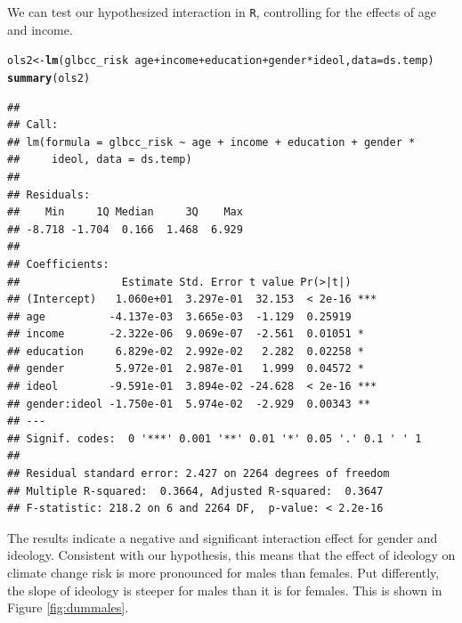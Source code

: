 \documentclass[11pt,openany]{book}
\makeatletter
\newcommand{\hlopt}[1]{\textcolor[rgb]{0,0,0}{#1}}%
\newcommand{\hlstd}[1]{\textcolor[rgb]{0.345,0.345,0.345}{#1}}%
\newcommand{\hlkwb}[1]{\textcolor[rgb]{0.69,0.353,0.396}{#1}}%
\newcommand{\hlkwc}[1]{\textcolor[rgb]{0.333,0.667,0.333}{#1}}%
\newcommand{\hlkwd}[1]{\textcolor[rgb]{0.737,0.353,0.396}{\textbf{#1}}}%
\newenvironment{kframe}{%
 \def\at@end@of@kframe{}%
 \ifinner\ifhmode%
  \def\at@end@of@kframe{\end{minipage}}%
  \begin{minipage}{\columnwidth}%
 \fi\fi%
 \def\FrameCommand##1{\hskip\@totalleftmargin \hskip-\fboxsep
 \colorbox{shadecolor}{##1}\hskip-\fboxsep
     \hskip-\linewidth \hskip-\@totalleftmargin \hskip\columnwidth}%
 \MakeFramed {\advance\hsize-\width
   \@totalleftmargin\z@ \linewidth\hsize
   \@setminipage}}%
 {\par\unskip\endMakeFramed%
 \at@end@of@kframe}
\newenvironment{knitrout}{}{} %
\renewenvironment{knitrout}{\begin{singlespace}}{\end{singlespace}}
\makeatother
\begin{document}
We can test our hypothesized interaction in \texttt{R}, controlling for the effects of age
and income. 
\begin{knitrout}
\color{fgcolor}\begin{kframe}
\begin{alltt}
\hlstd{ols2} \hlkwb{<-} \hlkwd{lm}\hlstd{(glbcc_risk} \hlopt{~} \hlstd{age} \hlopt{+} \hlstd{income} \hlopt{+} \hlstd{education} \hlopt{+} \hlstd{gender} \hlopt{*} \hlstd{ideol,} \hlkwc{data} \hlstd{= ds.temp)}
\hlkwd{summary}\hlstd{(ols2)}
\end{alltt}
\begin{verbatim}
## 
## Call:
## lm(formula = glbcc_risk ~ age + income + education + gender * 
##     ideol, data = ds.temp)
## 
## Residuals:
##    Min     1Q Median     3Q    Max 
## -8.718 -1.704  0.166  1.468  6.929 
## 
## Coefficients:
##                Estimate Std. Error t value Pr(>|t|)    
## (Intercept)   1.060e+01  3.297e-01  32.153  < 2e-16 ***
## age          -4.137e-03  3.665e-03  -1.129  0.25919    
## income       -2.322e-06  9.069e-07  -2.561  0.01051 *  
## education     6.829e-02  2.992e-02   2.282  0.02258 *  
## gender        5.972e-01  2.987e-01   1.999  0.04572 *  
## ideol        -9.591e-01  3.894e-02 -24.628  < 2e-16 ***
## gender:ideol -1.750e-01  5.974e-02  -2.929  0.00343 ** 
## ---
## Signif. codes:  0 '***' 0.001 '**' 0.01 '*' 0.05 '.' 0.1 ' ' 1
## 
## Residual standard error: 2.427 on 2264 degrees of freedom
## Multiple R-squared:  0.3664,	Adjusted R-squared:  0.3647 
## F-statistic: 218.2 on 6 and 2264 DF,  p-value: < 2.2e-16
\end{verbatim}
\end{kframe}
\end{knitrout}
The results indicate a negative and significant interaction effect for gender and ideology. Consistent with our hypothesis, this means that the effect of ideology on climate change risk is more pronounced for males than females. Put differently, the slope of ideology is steeper for males than it is for females. This is shown in Figure \ref{fig:dummales}. 
\end{document}
